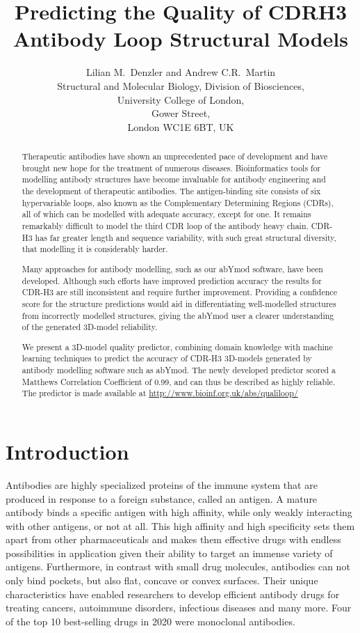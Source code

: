 \documentclass[12pt]{article}
\title{Predicting the Quality of CDRH3 Antibody Loop Structural Models}
\author{Lilian M.\ Denzler and Andrew C.R.\ Martin\\
Structural and Molecular Biology, Division of Biosciences,\\
University College of London,\\
Gower Street,\\
London WC1E 6BT, UK
}
\begin{document}
\maketitle

\begin{abstract}
  Therapeutic antibodies have shown an unprecedented pace of
  development and have brought new hope for the treatment of numerous
  diseases. Bioinformatics tools for modelling antibody structures
  have become invaluable for antibody engineering and the development
  of therapeutic antibodies. The antigen-binding site consists of six
  hypervariable loops, also known as the Complementary Determining
  Regions (CDRs), all of which can be modelled with adequate accuracy,
  except for one. It remains remarkably difficult to model the third CDR
  loop of the antibody heavy chain. CDR-H3 has
  far greater length and sequence variability, with such great structural
  diversity, that modelling it is considerably harder.

  Many approaches for antibody modelling, such as our
  abYmod software, have been developed. Although such efforts have
  improved prediction accuracy the results for CDR-H3 are
  still inconsistent and require further improvement. Providing a
  confidence score for the structure predictions would aid in
  differentiating well-modelled structures from incorrectly modelled
  structures, giving the abYmod user a clearer understanding of the
  generated 3D-model reliability.

  We present a 3D-model quality predictor, combining domain knowledge
  with machine learning techniques to predict the accuracy of CDR-H3
  3D-models generated by antibody modelling software such as abYmod. The
  newly developed predictor scored a Matthews Correlation Coefficient
  of 0.99, and can thus be described as highly reliable. The predictor
  is made available at \url{http://www.bioinf.org.uk/abs/qualiloop/}
\end{abstract}

\section{Introduction}

Antibodies are highly specialized proteins of the immune system that
are produced in response to a foreign substance, called an antigen. A
mature antibody binds a specific antigen with high affinity, while
only weakly interacting with other antigens, or not at all. This high affinity and high specificity sets them apart from other pharmaceuticals and makes them effective drugs with endless possibilities in application given their ability to target an immense variety of antigens.
Furthermore, in contrast with small drug molecules, antibodies can not
only bind pockets, but also flat, concave or convex
surfaces\cite{MacCallum1996}. Their unique characteristics have enabled 
researchers to develop efficient antibody drugs for treating cancers,
autoimmune disorders, infectious diseases and many more\cite{Lu2020}.
Four of the top 10 best-selling drugs in
2020 were monoclonal antibodies\cite{Urquhart2021}.
\end{document}
